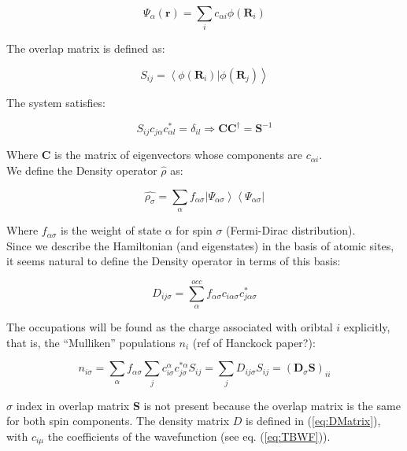\documentclass[amsmath,%
amssymb,prb,superscriptaddress]{revtex4}
\begin{document}
\begin{equation}\label{eq:TBWF}
\Psi_{\alpha}(\textbf{r}) = \sum_{i} c_{\alpha i}\phi(\textbf{R}_{i})
\end{equation}

The overlap matrix is defined as:

\begin{equation}
S_{ij} = \left\langle\phi(\textbf{R}_{i}) \right|\left. \phi(\textbf{R}_{j}) \right\rangle
\end{equation}

The system satisfies:

\begin{equation}
S_{ij}c_{j\alpha}c^{*}_{\alpha l} = \delta_{il} \Rightarrow \textbf{C}\textbf{C}^{\dagger} = \textbf{S}^{-1}
\end{equation}

Where $\textbf{C}$ is the matrix of eigenvectors whose components are $c_{\alpha i}$.\\

\medskip
We define the Density operator $\hat{\rho}$ as:

\begin{equation}
\hat{\rho_{\sigma}} = \sum_{\alpha}f_{\alpha\sigma} \left| \Psi_{\alpha\sigma}\right\rangle \left\langle \Psi_{\alpha\sigma} \right|
\end{equation}

Where $f_{\alpha\sigma}$ is the weight of state $\alpha$ for spin $\sigma$ (Fermi-Dirac distribution).\\

Since we describe the Hamiltonian (and eigenstates) in the basis of atomic sites, it seems natural to define the Density operator in terms of this basis:
 
\begin{equation}\label{eq:DMatrix}
D_{ij\sigma} = \sum_{\alpha}^{occ}f_{\alpha\sigma}c_{i \alpha\sigma}c^{*}_{j \alpha\sigma}
\end{equation}


The occupations will be found as the charge associated with oribtal $i$ explicitly, that is, the ``Mulliken'' populations $n_{i}$ (ref of Hanckock paper?):

\begin{equation}
n_{i\sigma} = \sum_{\alpha}f_{\alpha\sigma}\sum_{j}c^{\alpha}_{i\sigma}c^{*\alpha}_{j\sigma}S_{ij} = \sum_{j}D_{ij\sigma}S_{ij} =  (\textbf{D}_{\sigma}\textbf{S})_{ii}
\end{equation}

$\sigma$ index in overlap matrix $\textbf{S}$ is not present because the overlap matrix is the same for both spin components.
The density matrix $D$ is defined in (\ref{eq:DMatrix}), with $c_{i\mu}$ the coefficients of the wavefunction (see eq. (\ref{eq:TBWF})).\\
\end{document}
